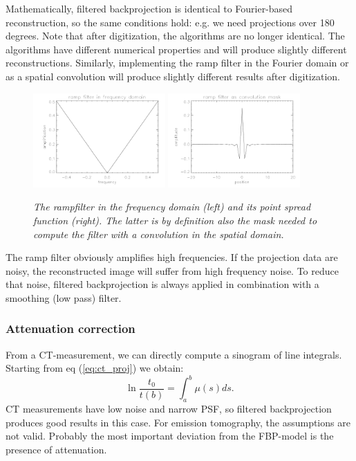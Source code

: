 \documentclass[11pt,oneside]{book}
\begin{document}
Mathematically, filtered backprojection is identical to Fourier-based
reconstruction, so the same conditions hold: e.g. we need projections over 180
degrees. Note that after digitization, the algorithms are no longer identical.
The algorithms have different numerical properties and will produce slightly
different reconstructions. Similarly, implementing the ramp filter in the
Fourier domain or as a spatial convolution will produce slightly different
results after digitization. 
%
\begin{figure}[tb]
  \includegraphics[width=0.45\textwidth]{figs/fig_rampfilter1.pdf}
  \includegraphics[width=0.45\textwidth]{figs/fig_rampfilter2.pdf}
\caption{\label{fig:rampfilter} \emph{The rampfilter in the frequency
    domain (left) and its point spread function (right). The latter is
    by definition also the mask needed to compute the filter with a
    convolution in the spatial domain.}}
\end{figure}

The ramp filter obviously amplifies high frequencies. If the
projection data are noisy, the reconstructed image will suffer from
high frequency noise. To reduce that noise, filtered backprojection is
always applied in combination with a smoothing (low pass) filter.

\subsubsection{Attenuation correction} \label{sec:attencor}
From a CT-measurement, we can directly compute a sinogram of line integrals.
Starting from eq (\ref{eq:ct_proj}) we obtain:
\begin{equation}
  \ln \frac{t_0}{t(b)} = \int_a^b \mu(s) ds. \label{eq:attencor}
\end{equation}
CT measurements have low noise and narrow PSF, so filtered backprojection
produces good results in this case. For emission tomography, the assumptions
are not valid. Probably the most important deviation from the FBP-model is the
presence of attenuation.
\end{document}
